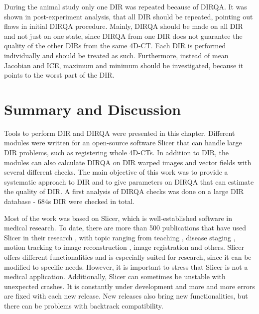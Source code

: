 \documentclass[type=dr, dr=rernat, accentcolor=tud7b,colorbacktitle, bigchapter, openright, twoside, 12pt ]{tudthesis}
\begin{document}
During the animal study only one DIR was repeated because of DIRQA. It was shown in post-experiment analysis, that all DIR should be repeated, pointing out flaws in initial DIRQA procedure.
Mainly, DIRQA should be made on all DIR and not just on one state, since DIRQA from one DIR does not guarantee the quality of the other DIRs from the same 4D-CT. 
Each DIR is performed individually and should be treated as such. Furthermore, instead of mean Jacobian and ICE, maximum and minimum should be investigated, 
because it points to the worst part of the DIR.





\section{Summary and Discussion}
\label{Summary}

Tools to perform DIR and DIRQA were presented in this chapter. Different modules were written for an open-source software Slicer that can handle large DIR problems, such as registering whole 4D-CTs. 
In addition to DIR, the modules can also calculate DIRQA on DIR warped images and vector fields with several different checks.
The main objective of this work was to provide a systematic approach to DIR and to give parameters on DIRQA that can estimate the quality of DIR. A first analysis of DIRQA checks was done on a large DIR database - 684s DIR were checked in total.

Most of the work was based on Slicer, which is well-established software in medical research. To date, there are more than 500 publications that have used Slicer in their research \cite{SlicerCitation}, with topic ranging from 
teaching \cite{Pujol2016}, disease staging \cite{Liu2015, Liu2016b}, motion tracking \cite{Behringer2015} to image reconstruction \cite{Meyer2015}, image registration \cite{Li2015, Fedorov2015, Li2015b}
and others. Slicer offers different functionalities and is especially suited for research, since it can be modified to specific needs. However, it is important to stress that Slicer 
is not a medical application. Additionally, Slicer can sometimes be unstable with unexpected crashes. It is constantly under development and more and more errors
are fixed with each new release. New releases also bring new functionalities, but there can be problems with backtrack compatibility. 
\end{document}
